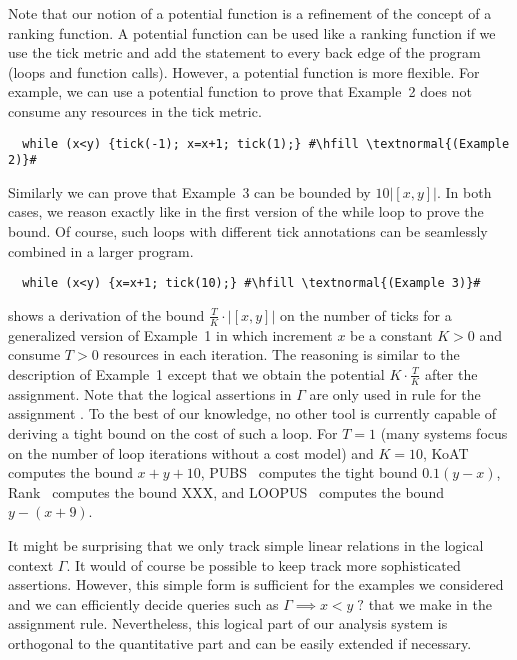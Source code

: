 \documentclass[nocopyrightspace,preprint]{sigplanconf}
\newcommand{\pref}[1]{\prettyref{#1}}
\begin{document}
Note that our notion of a potential function is a refinement of the
concept of a ranking function.  A potential function can be used like
a ranking function if we use the tick metric and add the statement
 to every back edge of the program (loops and function
calls).  However, a potential function is more flexible.  For example,
we can use a potential function to prove that Example~2 does not
consume any resources in the tick metric.
\begin{lstlisting}
  while (x<y) {tick(-1); x=x+1; tick(1);} #\hfill \textnormal{(Example 2)}#
\end{lstlisting}
Similarly we can prove that Example~3 can be bounded by $10|[x,y]|$.
In both cases, we reason exactly like in the first version of the
while loop to prove the bound.  Of course, such loops with different
tick annotations can be seamlessly combined in a larger program.
\begin{lstlisting}
  while (x<y) {x=x+1; tick(10);} #\hfill \textnormal{(Example 3)}#
\end{lstlisting}
%
\pref{fig:ex1} shows a derivation of the bound
$\frac{T}{K}{\cdot}|[x,y]|$ on the number of ticks for a generalized
version of Example~1 in which increment $x$ be a constant $K>0$ and
consume $T>0$ resources in each iteration.  The reasoning is similar
to the description of Example~1 except that we obtain the potential
$K{\cdot}\frac{T}{K}$ after the assignment.  Note that the logical
assertions in $\Gamma$ are only used in rule for the assignment
.  To the best of our knowledge, no other tool is
currently capable of deriving a tight bound on the cost of such a
loop.  For $T=1$ (many systems focus on the number of loop iterations
without a cost model) and $K=10$, KoAT~\cite{BrockschmidtEFFG14}
computes the bound $x + y + 10$, PUBS~\cite{AlbertAGPZ12} computes
the tight bound $0.1(y-x)$, Rank~\cite{AliasDFG10} computes the bound XXX, and
LOOPUS~\cite{SinnZV14} computes the bound $y-(x+9)$.

It might be surprising that we only track simple linear relations in
the logical context $\Gamma$.  It would of course be possible to keep
track more sophisticated assertions.  However, this simple form is
sufficient for the examples we considered and we can efficiently
decide queries such as $\Gamma \implies x<y \; ?$ that we make in the
assignment rule.  Nevertheless, this logical part of our analysis
system is orthogonal to the quantitative part and can be easily
extended if necessary.
\end{document}
